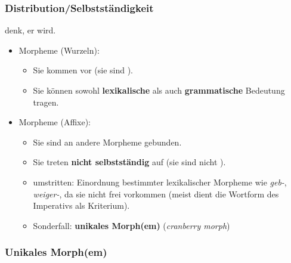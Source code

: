 \begin{frame}
\frametitle{Distribution/Selbstständigkeit}

\ea {} denk,  er    wird.
\z

\begin{itemize}

	\item {} Morpheme (Wurzeln): 
	
	\begin{itemize}
		\item Sie kommen  vor (sie sind ).
		
		\item Sie können sowohl \textbf{lexikalische} als auch \textbf{grammatische} Bedeutung tragen.
	\end{itemize}
	
\pause
	
	\item {} Morpheme (Affixe): 
	
	\begin{itemize}
		\item Sie sind an andere Morpheme gebunden.
		
		\item Sie treten \textbf{nicht selbstständig} auf (sie sind nicht ).
		
		\item umstritten: Einordnung bestimmter lexikalischer Morpheme wie \emph{geb-}, \emph{weiger-}, da sie nicht frei vorkommen (meist dient die Wortform des Imperativs als Kriterium).
		
\pause

		\item Sonderfall: \textbf{unikales Morph(em)} (\emph{cranberry morph})
	
	\end{itemize}
	
	
\end{itemize}
\end{frame}


\subsubsection{Unikales Morph(em)}


